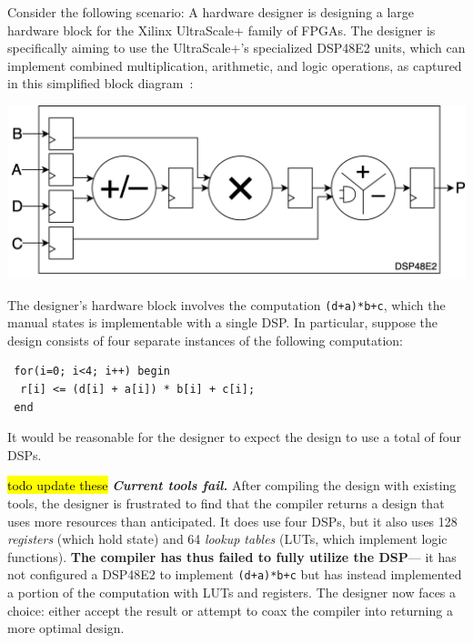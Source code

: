 Consider the following scenario:
A hardware designer
  is designing a large hardware block
  for the Xilinx UltraScale+ family of FPGAs.
The designer is specifically aiming to use 
  the UltraScale+'s specialized DSP48E2 units,
  which 
  can implement 
  combined multiplication, arithmetic,
  and logic operations, as 
  captured in this 
  simplified
  block diagram~\cite{userguide}:
\begin{center}
\includegraphics[width=.75\columnwidth]{lakeroad/assets/dsp48e2-block-diagram-simplified.drawio.png}
\end{center}
The designer's hardware block
  involves the computation
  \texttt{(d+a)*b+c},
  which the manual states is implementable with a single DSP.
In particular, suppose the design
  consists of four separate instances of the following computation:
\begin{center}
\begin{verbatim}
 for(i=0; i<4; i++) begin
  r[i] <= (d[i] + a[i]) * b[i] + c[i];
 end
\end{verbatim}
\end{center}
It would be reasonable for the designer
  to expect the design
  to use a total of four DSPs.

\hl{ todo update these}
\textit{\textbf{Current tools fail.}}
After compiling the design
  with existing tools,
  the designer is frustrated
  to find that the compiler returns a design
  that uses more
  resources than anticipated.
It does use four DSPs,
  but it also uses 128
  \textit{registers}
  (which hold state)
  and 64 \textit{lookup tables} 
  (LUTs, which implement logic functions).
\textbf{The compiler has thus failed to 
  fully utilize
  the DSP}---%
  it has not configured a DSP48E2
  to implement
  \texttt{(d+a)*b+c} but has instead
  implemented a portion of the
  computation
  with LUTs and registers.
The designer now faces a choice:
  either accept the result or attempt to coax the compiler
  into returning a more optimal design.

